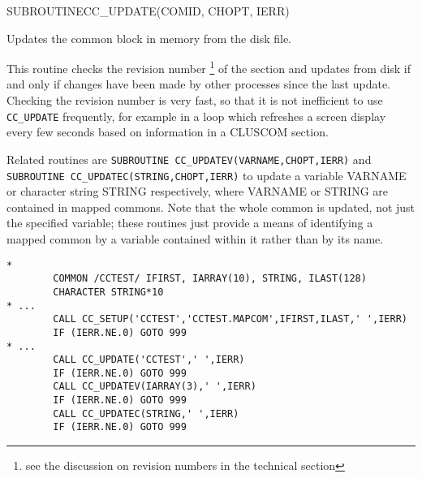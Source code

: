 \begin{routine} %
\subroutine
   {SUBROUTINE}{CC\_UPDATE}{(COMID, CHOPT, IERR)}
\begin{overview}
Updates the common block in memory from the disk file.
\end{overview}
\begin{argdeflist}
\end{argdeflist}
\begin{describe}
This routine checks the revision number
\footnote{see the discussion on revision numbers in the technical section}
of the section and
updates from disk if and only if changes have been made by other
processes since the last update. Checking the revision number is very
fast, so that it is not inefficient to use \verb|CC_UPDATE| frequently,
for example in a loop which refreshes a screen display every few
seconds based on information in a CLUSCOM section.

Related routines are \verb|SUBROUTINE CC_UPDATEV(VARNAME,CHOPT,IERR)|
and \verb|SUBROUTINE CC_UPDATEC(STRING,CHOPT,IERR)| to update a
variable VARNAME or character string STRING respectively, where
VARNAME or STRING are contained in mapped commons. Note that the
whole common is updated, not just the specified variable; these
routines just provide a means of identifying a mapped common by a variable
contained within it rather than by its name.

\end{describe}
\begin{options}
\end{options}
\begin{returncodes}
\end{returncodes}
\begin{examplecode}\begin{verbatim}
*
        COMMON /CCTEST/ IFIRST, IARRAY(10), STRING, ILAST(128)
        CHARACTER STRING*10
* ...
        CALL CC_SETUP('CCTEST','CCTEST.MAPCOM',IFIRST,ILAST,' ',IERR)
        IF (IERR.NE.0) GOTO 999
* ...
        CALL CC_UPDATE('CCTEST',' ',IERR)
        IF (IERR.NE.0) GOTO 999
        CALL CC_UPDATEV(IARRAY(3),' ',IERR)
        IF (IERR.NE.0) GOTO 999
        CALL CC_UPDATEC(STRING,' ',IERR)
        IF (IERR.NE.0) GOTO 999
\end{verbatim}\end{examplecode}
\end{routine}

